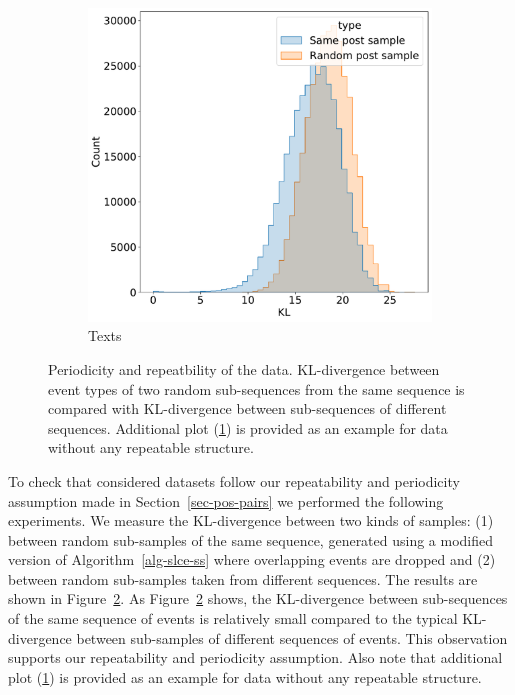 \documentclass[sigconf, anonymous]{acmart}
\begin{document}
\begin{figure}
\begin{subfigure}{0.25\linewidth}
    \caption{Texts}
    \centerline{\includegraphics[width=\linewidth]{figures/kl_dis_text.pdf}}
    \label{fig-subseq-kl-texts}
  \end{subfigure}
  \caption{Periodicity and repeatbility of the data. KL-divergence between event types of two random sub-sequences from the same sequence is compared with KL-divergence between sub-sequences of different sequences. Additional plot (\ref{fig-subseq-kl-texts}) is provided as an example for data without any repeatable structure.}
  \label{fig-subseq-kl}
\end{figure}

To check that considered datasets follow our repeatability and periodicity assumption made in Section~\ref{sec-pos-pairs}
we performed the following experiments. We measure the KL-divergence between two kinds of samples: (1) between random sub-samples of the same sequence, generated using a modified version of Algorithm~\ref{alg-slce-ss} where overlapping events are dropped and (2) between random sub-samples taken from different sequences. The results are shown in Figure~\ref{fig-subseq-kl}. As Figure~\ref{fig-subseq-kl} shows, the KL-divergence between sub-sequences of the same sequence of events is relatively small compared to the typical KL-divergence between sub-samples of different sequences of events. This observation supports our repeatability and periodicity assumption.
Also note that additional plot (\ref{fig-subseq-kl-texts}) is provided as an example for data without any repeatable structure.
\end{document}
